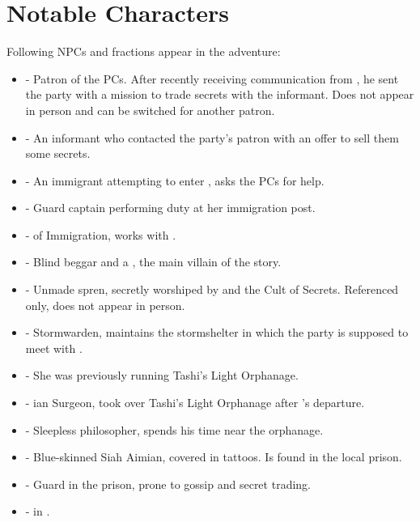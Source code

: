 \section{Notable Characters}
\label{personae}

Following NPCs and fractions appear in the adventure:

\begin{itemize}	
	\item \npcDalinar[s]{} - Patron of the PCs. After recently receiving communication from \npcInformant{}, he sent the party with a mission to trade secrets with the informant. Does not appear in person and can be switched for another patron.
	
	\item \npcInformant[s]{} - An informant who contacted the party's patron with an offer to sell them some secrets.
	
	\item \npcImmigrant[s]{} - An immigrant attempting to enter \locationYeddaw{}, asks the PCs for help.
	
	\item \npcHauka[s]{} - Guard captain performing duty at her immigration post.
	
	\item \npcNissiqqan[s]{} - \enemyScribeNameB{} of Immigration, works with \npcHauka{}.
	
	\item \npcBlindBeggar[s]{} - Blind beggar and a \enemyCorruptedLightweaverNameC{}, the main villain of the story.
	
	\item \npcSjaAnat[s]{} - Unmade spren, secretly worshiped by \npcBlindBeggar{} and the Cult of Secrets. Referenced only, does not appear in person.
	
	\item \npcStormwarden[s]{} - Stormwarden, maintains the stormshelter in which the party is supposed to meet with \npcInformant{}.
	
	\item \npcArshqqam[s]{} - She was previously running Tashi's Light Orphanage.
	
	\item \npcDoctor[s]{} - \locationKharbranth{}ian Surgeon, took over Tashi's Light Orphanage after \npcArshqqam{}'s departure.
	
	\item \npcArclo[s]{} - Sleepless philosopher, spends his time near the orphanage.
	
	\item \npcAxiesCollector[s]{} - Blue-skinned Siah Aimian, covered in tattoos. Is found in the local prison.
	
	\item \npcGossipGuard[s]{} - Guard in the \locationYeddaw{} prison, prone to gossip and secret trading.
	
	\item \npcGhenna[s]{} - \enemyScribeNameC{} in \locationIndicium{}.
\end{itemize}

